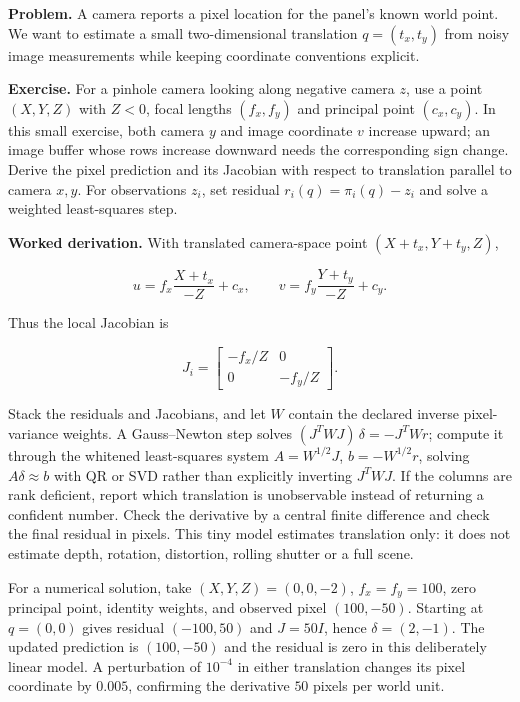 \hypertarget{02-foundations-ii-ch038-rung-4-reconstruct-a-measured-panel-position}{}

\textbf{Problem.} A camera reports a pixel location for the panel's known world point. We want to estimate a small two-dimensional translation \(q=(t_x,t_y)\) from noisy image measurements while keeping coordinate conventions explicit.

\textbf{Exercise.} For a pinhole camera looking along negative camera \(z\), use a point \((X,Y,Z)\) with \(Z<0\), focal lengths \((f_x,f_y)\) and principal point \((c_x,c_y)\). In this small exercise, both camera \(y\) and image coordinate \(v\) increase upward; an image buffer whose rows increase downward needs the corresponding sign change. Derive the pixel prediction and its Jacobian with respect to translation parallel to camera \(x,y\). For observations \(z_i\), set residual \(r_i(q)=\pi_i(q)-z_i\) and solve a weighted least-squares step.

\textbf{Worked derivation.} With translated camera-space point \((X+t_x,Y+t_y,Z)\),

\[
u=f_x\frac{X+t_x}{-Z}+c_x,\qquad v=f_y\frac{Y+t_y}{-Z}+c_y.
\]

Thus the local Jacobian is

\[
J_i=\begin{bmatrix}-f_x/Z&0\\0&-f_y/Z\end{bmatrix}.
\]

Stack the residuals and Jacobians, and let \(W\) contain the declared inverse pixel-variance weights. A Gauss--Newton step solves \((J^TWJ)\,\delta=-J^TWr\); compute it through the whitened least-squares system \(A=W^{1/2}J\), \(b=-W^{1/2}r\), solving \(A\delta\approx b\) with QR or SVD rather than explicitly inverting \(J^TWJ\). If the columns are rank deficient, report which translation is unobservable instead of returning a confident number. Check the derivative by a central finite difference and check the final residual in pixels. This tiny model estimates translation only: it does not estimate depth, rotation, distortion, rolling shutter or a full scene.

For a numerical solution, take \((X,Y,Z)=(0,0,-2)\), \(f_x=f_y=100\), zero principal point, identity weights, and observed pixel \((100,-50)\). Starting at \(q=(0,0)\) gives residual \((-100,50)\) and \(J=50I\), hence \(\delta=(2,-1)\). The updated prediction is \((100,-50)\) and the residual is zero in this deliberately linear model. A perturbation of \(10^{-4}\) in either translation changes its pixel coordinate by \(0.005\), confirming the derivative \(50\) pixels per world unit.

